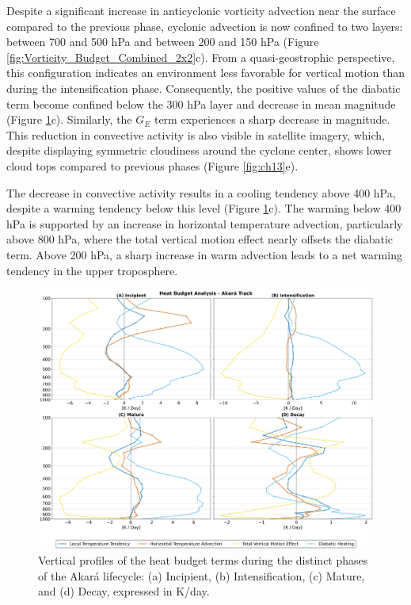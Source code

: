 \documentclass[pdflatex,sn-chicago]{sn-jnl}%
\theoremstyle{plain}
\theoremstyle{definition}
\theoremstyle{remark}
\theoremstyle{definition}
\begin{document}
Despite a significant increase in anticyclonic vorticity advection near the surface compared to the previous phase, cyclonic advection is now confined to two layers: between 700 and 500 hPa and between 200 and 150 hPa (Figure \ref{fig:Vorticity_Budget_Combined_2x2}c). From a quasi-geostrophic perspective, this configuration indicates an environment less favorable for vertical motion than during the intensification phase. Consequently, the positive values of the diabatic term become confined below the 300 hPa layer and decrease in mean magnitude (Figure \ref{fig:Heat_Budget_Combined_2x2}c). Similarly, the $G_E$ term experiences a sharp decrease in magnitude. This reduction in convective activity is also visible in satellite imagery, which, despite displaying symmetric cloudiness around the cyclone center, shows lower cloud tops compared to previous phases (Figure \ref{fig:ch13}e).

The decrease in convective activity results in a cooling tendency above 400 hPa, despite a warming tendency below this level (Figure \ref{fig:Heat_Budget_Combined_2x2}c). The warming below 400 hPa is supported by an increase in horizontal temperature advection, particularly above 800 hPa, where the total vertical motion effect nearly offsets the diabatic term. Above 200 hPa, a sharp increase in warm advection leads to a net warming tendency in the upper troposphere. 

\begin{figure}[h!]
\centering
\includegraphics[width=\textwidth]{Heat_Budget_Combined_2x2.png}
\caption{Vertical profiles of the heat budget terms during the distinct phases of the Akará lifecycle: (a) Incipient, (b) Intensification, (c) Mature, and (d) Decay, expressed in K/day.}
\label{fig:Heat_Budget_Combined_2x2}
\end{figure}
\end{document}
